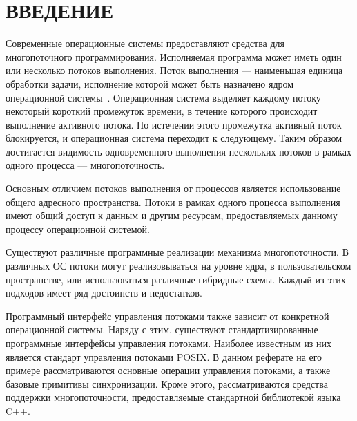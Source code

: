 \section*{ВВЕДЕНИЕ}

Современные операционные системы предоставляют средства для
многопоточного программирования.
Исполняемая программа может иметь один или несколько потоков выполнения.
Поток выполнения --- наименьшая единица обработки задачи,
исполнение которой может быть назначено ядром операционной системы~\cite{wiki_thread}.
Операционная система выделяет каждому потоку некоторый короткий
промежуток времени, в течение которого происходит выполнение
активного потока. По истечении этого промежутка активный
поток блокируется, и операционная система переходит к следующему.
Таким образом достигается видимость одновременного выполнения
нескольких потоков в рамках одного процесса --- многопоточность.

Основным отличием потоков выполнения от процессов является
использование общего адресного пространства.
Потоки в рамках одного процесса выполнения имеют общий доступ к данным
и другим ресурсам, предоставляемых данному процессу операционной системой.

Существуют различные программные реализации механизма многопоточности.
В различных ОС потоки могут реализовываться на уровне ядра,
в пользовательском пространстве, или использоваться различные гибридные схемы.
Каждый из этих подходов имеет ряд достоинств и недостатков.

Программный интерфейс управления потоками также зависит от конкретной
операционной системы. Наряду с этим, существуют стандартизированные
программные интерфейсы управления потоками.
Наиболее известным из них является стандарт управления потоками POSIX.
В данном реферате на его примере рассматриваются основные операции
управления потоками, а также базовые примитивы синхронизации.
Кроме этого, рассматриваются средства поддержки многопоточности,
предоставляемые стандартной библиотекой языка C++.
